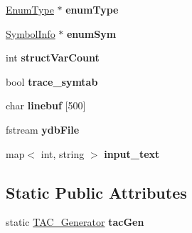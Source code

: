 \begin{DoxyCompactItemize}
\item 
\hypertarget{classCCompiler_a05461404c98f0c49ff711239228b05f7}{\hyperlink{classEnumType}{Enum\-Type} $\ast$ {\bfseries enum\-Type}}\label{classCCompiler_a05461404c98f0c49ff711239228b05f7}

\item 
\hypertarget{classCCompiler_acdc852314e1f491acf4eedd0d6342bb2}{\hyperlink{structSymbolInfo}{Symbol\-Info} $\ast$ {\bfseries enum\-Sym}}\label{classCCompiler_acdc852314e1f491acf4eedd0d6342bb2}

\item 
\hypertarget{classCCompiler_a786c697900f9a3e71f017c87274b3162}{int {\bfseries struct\-Var\-Count}}\label{classCCompiler_a786c697900f9a3e71f017c87274b3162}

\item 
\hypertarget{classCCompiler_a3c5de89c525d74fa8cbc0ff024cd1ec3}{bool {\bfseries trace\-\_\-symtab}}\label{classCCompiler_a3c5de89c525d74fa8cbc0ff024cd1ec3}

\item 
\hypertarget{classCCompiler_a883f08313cbea022b24f25d5ed710885}{char {\bfseries linebuf} \mbox{[}500\mbox{]}}\label{classCCompiler_a883f08313cbea022b24f25d5ed710885}

\item 
\hypertarget{classCCompiler_aa185f3a3e7345798eecf9e4cbfb6be1a}{fstream {\bfseries ydb\-File}}\label{classCCompiler_aa185f3a3e7345798eecf9e4cbfb6be1a}

\item 
\hypertarget{classCCompiler_a8898bce76cc8cce6e1eb516f1b09328d}{map$<$ int, string $>$ {\bfseries input\-\_\-text}}\label{classCCompiler_a8898bce76cc8cce6e1eb516f1b09328d}

\end{DoxyCompactItemize}
\subsection*{Static Public Attributes}
\begin{DoxyCompactItemize}
\item 
\hypertarget{classCCompiler_ad8fe69bbb8afffda34ca69325af7ff0b}{static \hyperlink{classTAC__Generator}{T\-A\-C\-\_\-\-Generator} {\bfseries tac\-Gen}}\label{classCCompiler_ad8fe69bbb8afffda34ca69325af7ff0b}

\end{DoxyCompactItemize}
